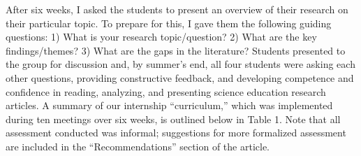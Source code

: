 \documentclass[11.5pt]{sig-alternate}
\begin{document}
\begin{large}
After six weeks, I asked the students to present an overview of their research on their particular topic. To prepare for this, I gave them the following guiding questions:  1) What is your research topic/question?  2) What are the key findings/themes?  3) What are the gaps in the literature?  Students presented to the group for discussion and, by summer’s end, all four students were asking each other questions, providing constructive feedback, and developing competence and confidence in reading, analyzing, and presenting science education research articles.  A summary of our internship “curriculum,” which was implemented during ten meetings over six weeks, is outlined below in Table 1.  Note that all assessment conducted was informal; suggestions for more formalized assessment are included in the “Recommendations” section of the article. 


\end{large}
\end{document}

